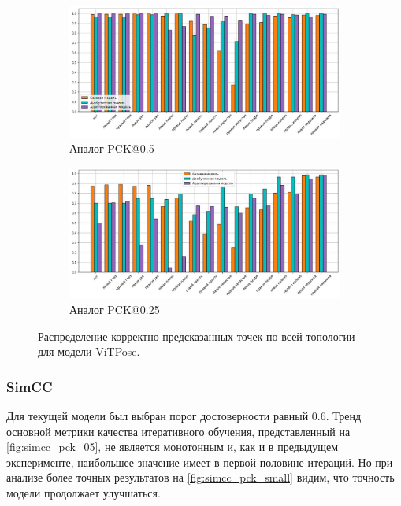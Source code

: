 \begin{figure}[H]
\centering
\begin{subfigure}{.8\textwidth}
	\centering
	\includegraphics[width=\textwidth]{./images/results/vitpose/vitpose_05_s}
	\caption{Аналог PCK@0.5}
	\label{fig:vitpose_distr_05}
\end{subfigure}
\begin{subfigure}{.8\textwidth}
	\centering
	\includegraphics[width=\textwidth]{./images/results/vitpose/vitpose_025_s}
	\caption{Аналог PCK@0.25}
	\label{fig:vitpose_distr_025}
\end{subfigure}
\caption{Распределение корректно предсказанных точек по всей топологии для модели ViTPose.}
\label{fig:vitpose_distr}
\end{figure}

\subsubsection*{SimCC}

Для текущей модели был выбран порог достоверности равный 0.6. Тренд основной метрики качества итеративного обучения, представленный на \autoref{fig:simcc_pck_05}, не является монотонным и, как и в предыдущем эксперименте, наибольшее значение имеет в первой половине итераций. Но при анализе более точных результатов на \autoref{fig:simcc_pck_small} видим, что точность модели продолжает улучшаться.

